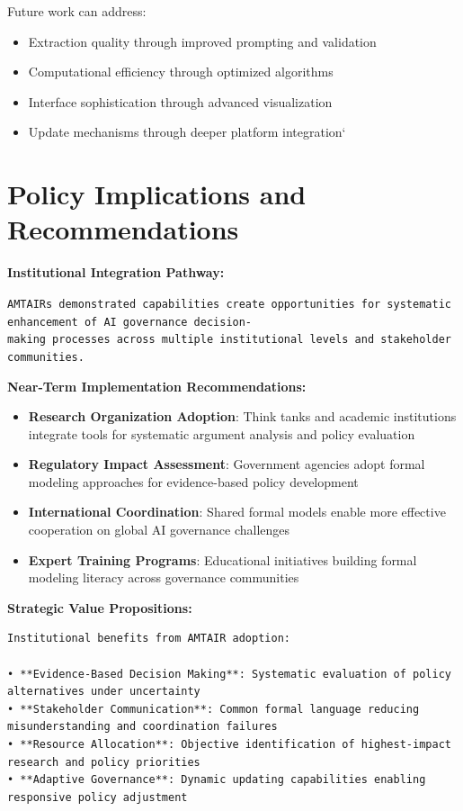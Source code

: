 \documentclass[
  11pt,
  letterpaper,
]{book}
\providecommand{\tightlist}{%
  \setlength{\itemsep}{0pt}\setlength{\parskip}{0pt}}
\begin{document}
Future work can address:

\begin{itemize}
\tightlist
\item
  Extraction quality through improved prompting and validation
\item
  Computational efficiency through optimized algorithms
\item
  Interface sophistication through advanced visualization
\item
  Update mechanisms through deeper platform integration`
\end{itemize}

\section{Policy Implications and
Recommendations}\label{sec-policy-implications}

\textbf{Institutional Integration Pathway:}

\texttt{AMTAIR\textquotesingle{}s\ demonstrated\ capabilities\ create\ opportunities\ for\ systematic\ enhancement\ of\ AI\ governance\ decision-making\ processes\ across\ multiple\ institutional\ levels\ and\ stakeholder\ communities.}

\textbf{Near-Term Implementation Recommendations:}

\begin{itemize}
\tightlist
\item
  \textbf{Research Organization Adoption}: Think tanks and academic
  institutions integrate tools for systematic argument analysis and
  policy evaluation
\item
  \textbf{Regulatory Impact Assessment}: Government agencies adopt
  formal modeling approaches for evidence-based policy development
\item
  \textbf{International Coordination}: Shared formal models enable more
  effective cooperation on global AI governance challenges
\item
  \textbf{Expert Training Programs}: Educational initiatives building
  formal modeling literacy across governance communities
\end{itemize}

\textbf{Strategic Value Propositions:}

\begin{verbatim}
Institutional benefits from AMTAIR adoption:

• **Evidence-Based Decision Making**: Systematic evaluation of policy alternatives under uncertainty
• **Stakeholder Communication**: Common formal language reducing misunderstanding and coordination failures  
• **Resource Allocation**: Objective identification of highest-impact research and policy priorities
• **Adaptive Governance**: Dynamic updating capabilities enabling responsive policy adjustment
\end{verbatim}
\end{document}
